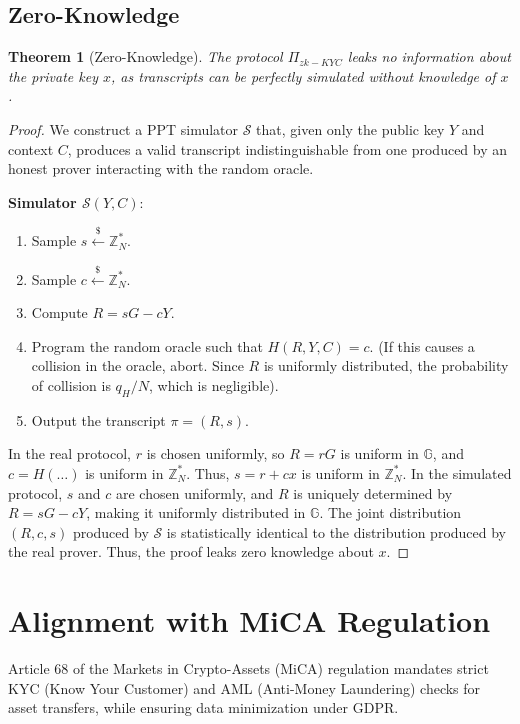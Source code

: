 \documentclass[11pt,a4paper]{article}
\newtheorem{theorem}{Theorem}
\begin{document}
\subsection{Zero-Knowledge}
\begin{theorem}[Zero-Knowledge]
The protocol $\Pi_{zk-KYC}$ leaks no information about the private key $x$, as transcripts can be perfectly simulated without knowledge of $x$.
\end{theorem}
\begin{proof}
We construct a PPT simulator $\mathcal{S}$ that, given only the public key $Y$ and context $C$, produces a valid transcript indistinguishable from one produced by an honest prover interacting with the random oracle.

\textbf{Simulator $\mathcal{S}(Y, C)$}:
\begin{enumerate}
    \item Sample $s \xleftarrow{\$} \mathbb{Z}_N^*$.
    \item Sample $c \xleftarrow{\$} \mathbb{Z}_N^*$.
    \item Compute $R = sG - cY$.
    \item Program the random oracle such that $H(R, Y, C) = c$. (If this causes a collision in the oracle, abort. Since $R$ is uniformly distributed, the probability of collision is $q_H / N$, which is negligible).
    \item Output the transcript $\pi = (R, s)$.
\end{enumerate}

In the real protocol, $r$ is chosen uniformly, so $R = rG$ is uniform in $\mathbb{G}$, and $c = H(\dots)$ is uniform in $\mathbb{Z}_N^*$. Thus, $s = r + cx$ is uniform in $\mathbb{Z}_N^*$.
In the simulated protocol, $s$ and $c$ are chosen uniformly, and $R$ is uniquely determined by $R = sG - cY$, making it uniformly distributed in $\mathbb{G}$.
The joint distribution $(R, c, s)$ produced by $\mathcal{S}$ is statistically identical to the distribution produced by the real prover. Thus, the proof leaks zero knowledge about $x$.
\end{proof}

\section{Alignment with MiCA Regulation}
Article 68 of the Markets in Crypto-Assets (MiCA) regulation mandates strict KYC (Know Your Customer) and AML (Anti-Money Laundering) checks for asset transfers, while ensuring data minimization under GDPR.
\end{document}
